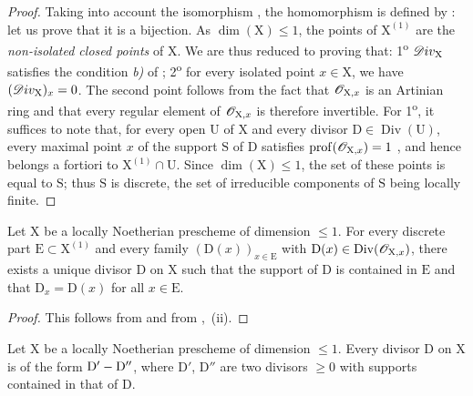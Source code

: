 \begin{proof}
Taking into account the isomorphism , the homomorphism  is defined by :
let us prove that it is a bijection.
As $\dim(\mathrm{X})\leq 1$, the points of $\mathrm{X}^{(1)}$ are the \emph{non-isolated closed points} of $\mathrm{X}$.
We are thus reduced to proving that:
1\textsuperscript{o} $\mathscr{D}iv_\mathrm{X}$ satisfies the condition \emph{b)} of ;
2\textsuperscript{o} for every isolated point $x\in\mathrm{X}$, we have $(\mathscr{D}iv_\mathrm{X})_x=0$.
The second point follows from the fact that $\mathscr{O}_{\mathrm{X},x}$ is an Artinian ring and that every regular element of $\mathscr{O}_{\mathrm{X},x}$ is therefore invertible.
For 1\textsuperscript{o}, it suffices to note that, for every open $\mathrm{U}$ of $\mathrm{X}$ and every divisor $\mathrm{D}\in\operatorname{Div}(\mathrm{U})$, every maximal point $x$ of the support $\mathrm{S}$ of $\mathrm{D}$ satisfies $\operatorname{prof}(\mathscr{O}_{\mathrm{X},x})=1$ , and hence belongs a fortiori to $\mathrm{X}^{(1)}\cap\mathrm{U}$.
Since $\dim(\mathrm{X})\leq1$, the set of these points is equal to $\mathrm{S}$; thus $\mathrm{S}$ is discrete, the set of irreducible components of $\mathrm{S}$ being locally finite.
\end{proof}

\begin{corollary}[21.9.5]
\label{IV.21.9.5}
Let $\mathrm{X}$ be a locally Noetherian prescheme of dimension $\leq 1$.
For every discrete part $\mathrm{E}\subset\mathrm{X}^{(1)}$ and every family $(\mathrm{D}(x))_{x\in\mathrm{E}}$ with $\mathrm{D}(x)\in\operatorname{Div}(\mathscr{O}_{\mathrm{X},x})$, there exists a unique divisor $\mathrm{D}$ on $\mathrm{X}$ such that the support of $\mathrm{D}$ is contained in $\mathrm{E}$ and that $\mathrm{D}_x=\mathrm{D}(x)$ for all $x\in\mathrm{E}$.
\end{corollary}

\begin{proof}
This follows from  and from ,{}~(ii).
\end{proof}

\begin{corollary}[21.9.6]
\label{IV.21.9.6}
Let $\mathrm{X}$ be a locally Noetherian prescheme of dimension $\leq 1$.
Every divisor $\mathrm{D}$ on $\mathrm{X}$ is of the form $\mathrm{D}'-\mathrm{D}''$, where $\mathrm{D}'$, $\mathrm{D}''$ are two divisors $\geq 0$ with supports contained in that of $\mathrm{D}$.
\end{corollary}

